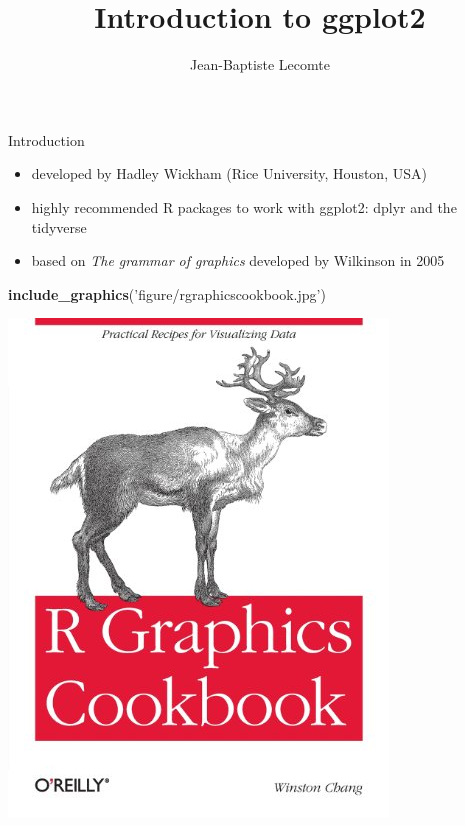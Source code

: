 \documentclass[
  ignorenonframetext,
]{beamer}
\title{Introduction to ggplot2}
\author{Jean-Baptiste Lecomte}
\date{}
\newenvironment{Shaded}{\begin{snugshade}}{\end{snugshade}}
\newcommand{\KeywordTok}[1]{\textcolor[rgb]{0.13,0.29,0.53}{\textbf{#1}}}
\newcommand{\NormalTok}[1]{#1}
\newcommand{\StringTok}[1]{\textcolor[rgb]{0.31,0.60,0.02}{#1}}
\providecommand{\tightlist}{%
  \setlength{\itemsep}{0pt}\setlength{\parskip}{0pt}}
\begin{document}
\frame{\titlepage}

\begin{frame}[fragile]{Introduction}
\protect\hypertarget{introduction}{}

\begin{itemize}
\tightlist
\item
  developed by Hadley Wickham (Rice University, Houston, USA)
\item
  highly recommended R packages to work with ggplot2: dplyr and the
  tidyverse
\item
  based on \emph{The grammar of graphics} developed by Wilkinson in 2005
\end{itemize}

\begin{Shaded}
\begin{Highlighting}[]
\KeywordTok{include_graphics}\NormalTok{(}\StringTok{'figure/rgraphicscookbook.jpg'}\NormalTok{)}
\end{Highlighting}
\end{Shaded}

\begin{center}\includegraphics[width=0.8\linewidth]{figure/rgraphicscookbook} \end{center}

\end{frame}
\end{document}
